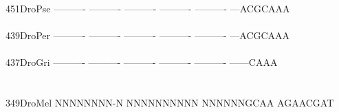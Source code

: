 \documentclass[11pt,twoside,reqno,a4paper]{article}
\begin{document}
{451\hspace*{1\charwidth}DroPse	----------	----------	----------	----------	----------	---ACGCAAA	\\
\hspace*{4\charwidth}\hspace*{7\charwidth}\hspace*{1\charwidth}\hspace*{1\charwidth}\hspace*{1\charwidth}\hspace*{1\charwidth}\hspace*{1\charwidth}\hspace*{1\charwidth}\\
439\hspace*{1\charwidth}DroPer	----------	----------	----------	----------	----------	---ACGCAAA	\\
\hspace*{4\charwidth}\hspace*{7\charwidth}\hspace*{1\charwidth}\hspace*{1\charwidth}\hspace*{1\charwidth}\hspace*{1\charwidth}\hspace*{1\charwidth}\hspace*{1\charwidth}\\
437\hspace*{1\charwidth}DroGri	----------	----------	----------	----------	----------	------CAAA	\\
\hspace*{4\charwidth}\hspace*{7\charwidth}\hspace*{1\charwidth}\hspace*{1\charwidth}\hspace*{1\charwidth}\hspace*{1\charwidth}\hspace*{1\charwidth}\hspace*{1\charwidth}\\
\\
349\hspace*{1\charwidth}DroMel	NNNNNNNN-N	NNNNNNNNNN	NNNNNNGCAA	AGAACGAT\\
\hspace*{4\charwidth}\hspace*{7\charwidth}\hspace*{1\charwidth}\hspace*{1\charwidth}\hspace*{1\charwidth}\\
}
\end{document}
